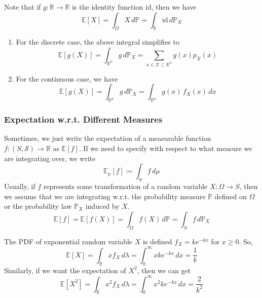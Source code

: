     Note that if $g: \mathbb{R} \rightarrow \mathbb{R}$ is the identity function $\mathrm{id}$, then we have 
    \begin{equation}
      \mathbb{E}[X] = \int_\Omega X \,d\mathbb{P} = \int_{\mathbb{R}} \mathrm{id} \, d\mathbb{P}_X
    \end{equation}
    \begin{enumerate}
      \item For the discrete case, the above integral simplifies to 
      \begin{equation}
        \mathbb{E}[g(X)] = \int_{\mathbb{R}^n} g \,d \mathbb{P}_X = \sum_{x \in \mathcal{X} \subset \mathbb{R}^n} g(x) p_X (x)
      \end{equation}
      
      \item For the continuous case, we have 
      \begin{equation}
        \mathbb{E}[g(X)] = \int_{\mathbb{R}^n} g \,d \mathbb{P}_X = \int_{\mathbb{R}^n} g (x) \, f_X (x) \,dx
      \end{equation}
    \end{enumerate}

  \subsubsection{Expectation w.r.t. Different Measures}

    Sometimes, we just write the expectation of a measurable function $f: (S, \mathcal{S}) \rightarrow \mathbb{R}$ as $\mathbb{E}[f]$. If we need to specify with respect to what measure we are integrating over, we write 
    \begin{equation}
      \mathbb{E}_\mu [f] \coloneqq \int_S f \, d\mu
    \end{equation}
    Usually, if $f$ represents some transformation of a random variable $X: \Omega \rightarrow S$, then we assume that we are integrating w.r.t. the probability measure $\mathbb{P}$ defined on $\Omega$ or the probability law $\mathbb{P}_X$ induced by $X$. 
    \begin{equation}
      \mathbb{E}[f] = \mathbb{E}[f(X)] = \int_\Omega f(X) \,d\mathbb{P} = \int_S f \,d\mathbb{P}_X
    \end{equation}

    \begin{example}
    The PDF of exponential random variable $X$ is defined $f_X = k e^{-k x}$ for $x \geq 0$. So, 
    \begin{equation}
      \mathbb{E}[X] = \int_\mathbb{R} x f_X \, d\lambda = \int_0^\infty x k e^{-k x} \, dx = \frac{1}{k}
    \end{equation}
    Similarly, if we want the expectation of $X^2$, then we can get 
    \begin{equation}
      \mathbb{E}[X^2] = \int_\mathbb{R} x^2 f_X \,d\lambda = \int_0^\infty x^2 k e^{-k x} \,dx = \frac{2}{k^2}
    \end{equation}
    \end{example} 

